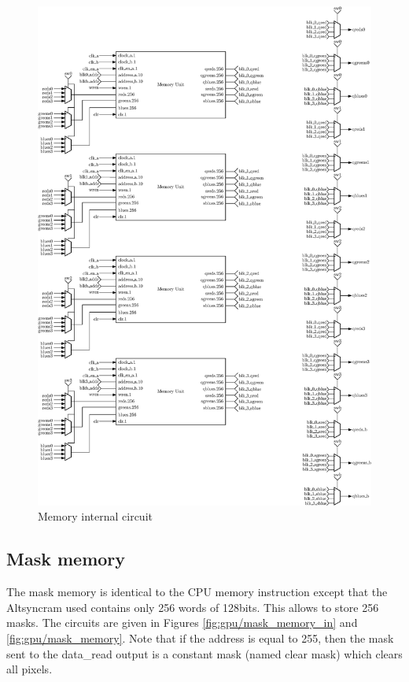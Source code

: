 \begin{figure}[H]
    \centering
    \includegraphics[scale=0.55]{Chapter4-GPU_CLKU/res/memory_in_part1}
    \caption{Memory internal circuit}
    \label{fig:gpu/memory_in}
\end{figure}


\subsection{Mask memory}

The mask memory is identical to the CPU memory instruction except that the Altsyncram used contains 
only 256 words of 128bits. This allows to store 256 masks. The circuits are given in Figures
\ref{fig:gpu/mask_memory_in} and \ref{fig:gpu/mask_memory}. Note that if the address is equal to
255, then the mask sent to the data\_read output is a constant mask (named clear mask) which 
clears all pixels.

